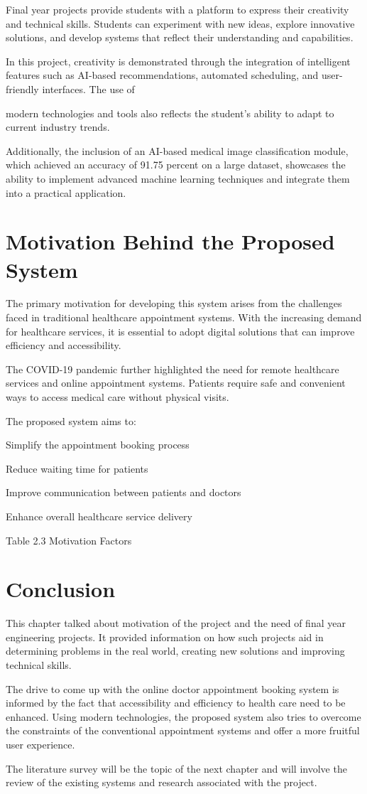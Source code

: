 Final year projects provide students with a platform to express their creativity and technical skills. Students can experiment with new ideas, explore innovative solutions, and develop systems that reflect their understanding and capabilities.

In this project, creativity is demonstrated through the integration of intelligent features such as AI-based recommendations, automated scheduling, and user-friendly interfaces. The use of

modern technologies and tools also reflects the student's ability to adapt to current industry trends.

Additionally, the inclusion of an AI-based medical image classification module, which achieved an accuracy of 91.75 percent on a large dataset, showcases the ability to implement advanced machine learning techniques and integrate them into a practical application.

\section{Motivation Behind the Proposed System}

The primary motivation for developing this system arises from the challenges faced in traditional healthcare appointment systems. With the increasing demand for healthcare services, it is essential to adopt digital solutions that can improve efficiency and accessibility.

The COVID-19 pandemic further highlighted the need for remote healthcare services and online appointment systems. Patients require safe and convenient ways to access medical care without physical visits.

The proposed system aims to:

Simplify the appointment booking process

Reduce waiting time for patients

Improve communication between patients and doctors

Enhance overall healthcare service delivery

Table 2.3 Motivation Factors

\section{Conclusion}

This chapter talked about motivation of the project and the need of final year engineering projects. It provided information on how such projects aid in determining problems in the real world, creating new solutions and improving technical skills.

The drive to come up with the online doctor appointment booking system is informed by the fact that accessibility and efficiency to health care need to be enhanced. Using modern technologies, the proposed system also tries to overcome the constraints of the conventional appointment systems and offer a more fruitful user experience.

The literature survey will be the topic of the next chapter and will involve the review of the existing systems and research associated with the project.
